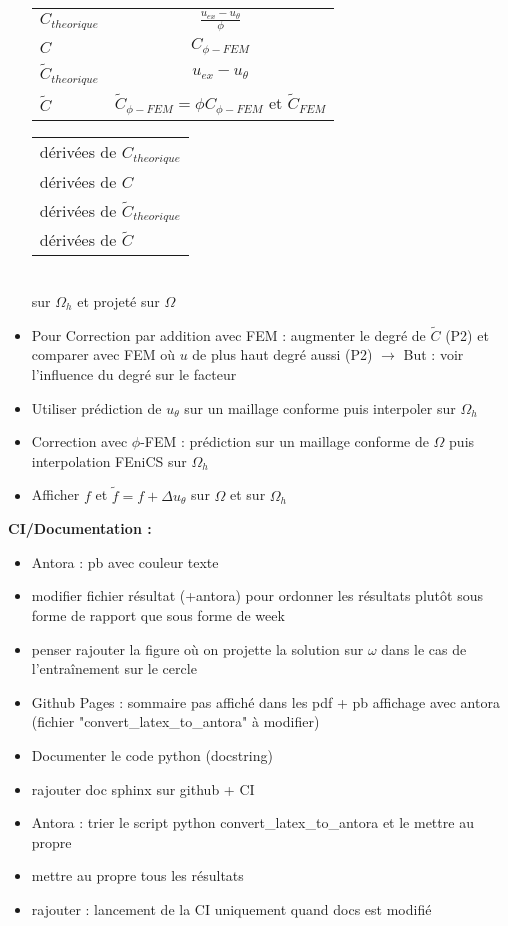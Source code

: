 \begin{itemize}[label=$\square$]
\begin{minipage}{0.48\linewidth}
		\begin{tabular}[\linewidth]{lc}
			$C_{theorique}$ & $\frac{u_{ex}-u_\theta}{\phi}$ \\
			$C$ & $C_{\phi-FEM}$ \\
			$\tilde{C}_{theorique}$ & $u_{ex}-u_\theta$ \\
			$\tilde{C}$ & $\tilde{C}_{\phi-FEM}=\phi C_{\phi-FEM}$ et $\tilde{C}_{FEM}$
		\end{tabular}
	\end{minipage}
	\begin{minipage}{0.48\linewidth}
		\begin{tabular}[\linewidth]{l}
			dérivées de $C_{theorique}$ \\
			dérivées de $C$ \\
			dérivées de $\tilde{C}_{theorique}$ \\
			dérivées de $\tilde{C}$
		\end{tabular}
	\end{minipage} \\
	sur $\Omega_h$ et projeté sur $\Omega$
	\item[\previous{7}] Pour Correction par addition avec FEM : augmenter le degré de $\tilde{C}$ (P2) et comparer avec FEM où $u$ de plus haut degré aussi (P2) $\rightarrow$ But : voir l'influence du degré sur le facteur
	\item[\previous{7}] Utiliser prédiction de $u_\theta$ sur un maillage conforme puis interpoler sur $\Omega_h$
	\item[\previous{7}] Correction avec $\phi$-FEM : prédiction sur un maillage conforme de $\Omega$ puis interpolation FEniCS sur $\Omega_h$
	\item[\previous{7}] Afficher $f$ et $\tilde{f}=f+\Delta u_\theta$ sur $\Omega$ et sur $\Omega_h$
\end{itemize}
\textbf{CI/Documentation :}
\begin{itemize}[label=$\square$] 
	\item[\previous{6}] Antora : pb avec couleur texte
	\item[\previous{7}] modifier fichier résultat (+antora) pour ordonner les résultats plutôt sous forme de rapport que sous forme de week
	\item[\previous{7}] penser rajouter la figure où on projette la solution sur $\omega$ dans le cas de l'entraînement sur le cercle
	\item[\previous{8}] Github Pages : sommaire pas affiché dans les pdf + pb affichage avec antora (fichier "convert\_latex\_to\_antora" à modifier)
	\item[\previous{8}] Documenter le code python (docstring)
	\item[\previous{8}] rajouter doc sphinx sur github + CI
	\item[\previous{8}] Antora : trier le script python convert\_latex\_to\_antora et le mettre au propre
	\item[\previous{8}] mettre au propre tous les résultats 
	\item[\previous{8}] rajouter : lancement de la CI uniquement quand docs est modifié
\end{itemize}
